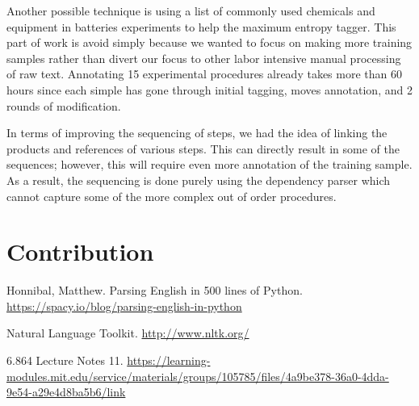 Another possible technique is using a list of commonly used chemicals and equipment in batteries experiments to help the maximum entropy tagger. This part of work is avoid simply because we wanted to focus on making more training samples rather than divert our focus to other labor intensive manual processing of raw text. Annotating 15 experimental procedures already takes more than 60 hours since each simple has gone through initial tagging, moves annotation, and 2 rounds of modification. 

In terms of improving the sequencing of steps, we had the idea of linking the products and references of various steps. This can directly result in some of the sequences; however, this will require even more annotation of the training sample. As a result, the sequencing is done purely using the dependency parser which cannot capture some of the more complex out of order procedures. 

\section{Contribution}


\begin{thebibliography}{8}
Honnibal, Matthew. Parsing English in 500 lines of Python.
\href{https://spacy.io/blog/parsing-english-in-python}{https://spacy.io/blog/parsing-english-in-python}

Natural Language Toolkit.
\href{http://www.nltk.org/}{http://www.nltk.org/}

6.864 Lecture Notes 11. 
\href{https://learning-modules.mit.edu/service/materials/groups/105785/files/4a9be378-36a0-4dda-9e54-a29e4d8ba5b6/link}{https://learning-modules.mit.edu/service/materials/groups/105785/files/4a9be378-36a0-4dda-9e54-a29e4d8ba5b6/link}

\end{thebibliography}


